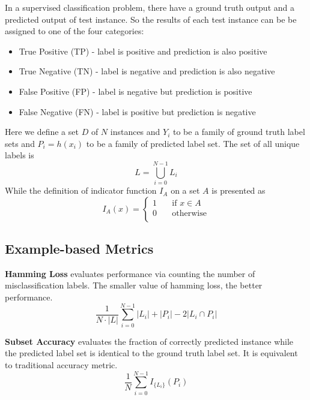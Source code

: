 In a supervised classification problem, there have a ground truth output and a predicted output of test instance. So the results of each test instance can be be assigned to one of the four categories:
\begin{itemize}
\item True Positive (TP) - label is positive and prediction is also positive
\item True Negative (TN) - label is negative and prediction is also negative
\item False Positive (FP) - label is negative but prediction is positive
\item False Negative (FN) - label is positive but prediction is negative
\end{itemize}

Here we define a set $D$ of $N$ instances and $Y_{i}$ to be a family of ground truth label sets and $P_{i} = h(x_{i})$ to be a family of predicted label set. The set of all unique labels is
\begin{equation}\label{eq:UniLabel}
L = \bigcup_{i=0}^{N-1} L_{i}
\end{equation}
While the definition of indicator function $I_{A}$ on a set $A$ is presented as
\begin{equation}\label{eq:IndicatorFunc}
I_{A}(x) =
  \begin{cases}
    1       & \quad \text{if } x \in A\\
    0  & \quad \text{otherwise}\\
  \end{cases}
\end{equation}

\subsection{Example-based Metrics}

\textbf{Hamming Loss} evaluates performance via counting the number of misclassification labels. The smaller value of hamming loss, the better performance.
\begin{equation}\label{eq:HammingLoss}
\frac{1}{N \cdot \left|L\right|} \sum_{i=0}^{N - 1} \left|L_i\right| + \left|P_i\right| - 2\left|L_i
          \cap P_i\right|
\end{equation}

\textbf{Subset Accuracy} evaluates the fraction of correctly predicted instance while the predicted label set is identical to the ground truth label set. It is equivalent to traditional accuracy metric.
\begin{equation}\label{eq:SubsetAcu}
\frac{1}{N} \sum_{i=0}^{N-1} I_{\{L_i\}}(P_i)
\end{equation}

